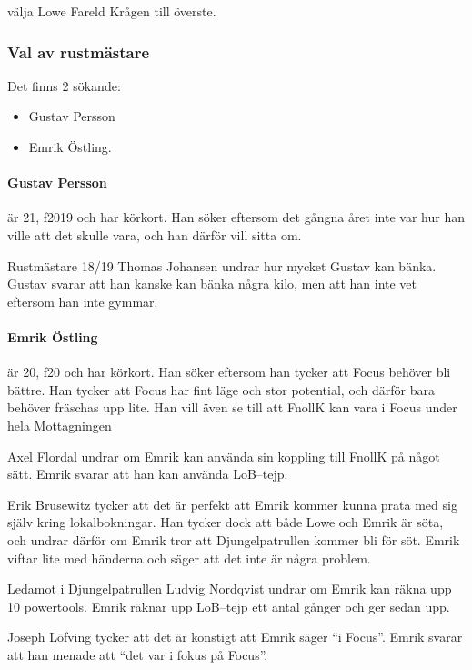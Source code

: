 \documentclass[hidelinks]{sektionsmote}
\begin{document}
\begin{beslut}
  \item välja Lowe Fareld Krågen till överste.
\end{beslut}

\subsubsection{Val av rustmästare}
Det finns 2 sökande:
\begin{itemize}
    \item Gustav Persson
    \item Emrik Östling.
\end{itemize}

\paragraph{Gustav Persson} är 21, f2019 och har körkort.
Han söker eftersom det gångna året inte var hur han ville att det skulle vara, och han därför vill sitta om.

Rustmästare 18/19 Thomas Johansen undrar hur mycket Gustav kan bänka.
Gustav svarar att han kanske kan bänka några kilo, men att han inte vet eftersom han inte gymmar.

\paragraph{Emrik Östling} är 20, f20 och har körkort.
Han söker eftersom han tycker att Focus behöver bli bättre.
Han tycker att Focus har fint läge och stor potential, och därför bara behöver fräschas upp lite.
Han vill även se till att FnollK kan vara i Focus under hela Mottagningen

Axel Flordal undrar om Emrik kan använda sin koppling till FnollK på något sätt.
Emrik svarar att han kan använda LoB--tejp.

Erik Brusewitz tycker att det är perfekt att Emrik kommer kunna prata med sig själv kring lokalbokningar.
Han tycker dock att både Lowe och Emrik är söta, och undrar därför om Emrik tror att Djungelpatrullen kommer bli för söt.
Emrik viftar lite med händerna och säger att det inte är några problem.

Ledamot i Djungelpatrullen Ludvig Nordqvist undrar om Emrik kan räkna upp 10 powertools.
Emrik räknar upp LoB--tejp ett antal gånger och ger sedan upp.

Joseph Löfving tycker att det är konstigt att Emrik säger \enquote{i Focus}.
Emrik svarar att han menade att \enquote{det var i fokus på Focus}.
\end{document}
